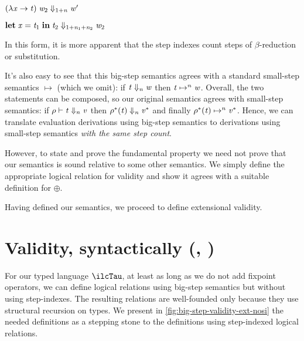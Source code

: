 \begin{typing}


  {\ensuremath{(\lambda \Varid{x}\to \Varid{t})\;\Varid{w}_{2}\Downarrow_{\mathrm{1}\mathbin{+}\Varid{n}}\Varid{w'}}}

  {\ensuremath{\mathbf{let}\;\Varid{x}\mathrel{=}\Varid{t}_{1}\;\mathbf{in}\;\Varid{t}_{2}\Downarrow_{\mathrm{1}\mathbin{+}\Varid{n}_{1}\mathbin{+}\Varid{n}_{2}}\Varid{w}_{2}}}
\end{typing}
In this form, it is more apparent that the step indexes count
steps of $\beta$-reduction or substitution.

It's also easy to see that this big-step semantics agrees with a
standard small-step semantics $\mapsto$ (which we omit):
if \ensuremath{\Varid{t}\Downarrow_{\Varid{n}}\Varid{w}} then $\mathit{t} \mapsto^{n} \mathit{w}$.
Overall, the two statements can be composed, so our original
semantics agrees with small-step semantics:
if \ensuremath{\rho\vdash\Varid{t}\Downarrow_{\Varid{n}}\Varid{v}} then \ensuremath{\rho^*(\Varid{t})\Downarrow_{\Varid{n}}\Varid{v}^*}
and finally
$\rho^*(\mathit{t}) \mapsto^{n} \mathit{v}^*$.
Hence, we can translate evaluation derivations using big-step
semantics to derivations using small-step semantics \emph{with
  the same step count}.

However, to state and prove the fundamental property we need not
prove that our semantics is sound relative to some other
semantics. We simply define the appropriate logical relation for
validity and show it agrees with a suitable definition for \ensuremath{\oplus }.

Having defined our semantics, we proceed to define extensional validity.

\section{Validity, syntactically (\ilcTau{}, \dilcTau)}
\label{sec:typed-proof}
For our typed language \ensuremath{\ilcTau}, at least as long as we do not add
fixpoint operators, we can define logical
relations using big-step semantics but without using
step-indexes. The resulting relations are well-founded only
because they use structural recursion on types.
We present in \cref{fig:big-step-validity-ext-nosi}
the needed definitions as a stepping stone to the
definitions using step-indexed logical relations.

